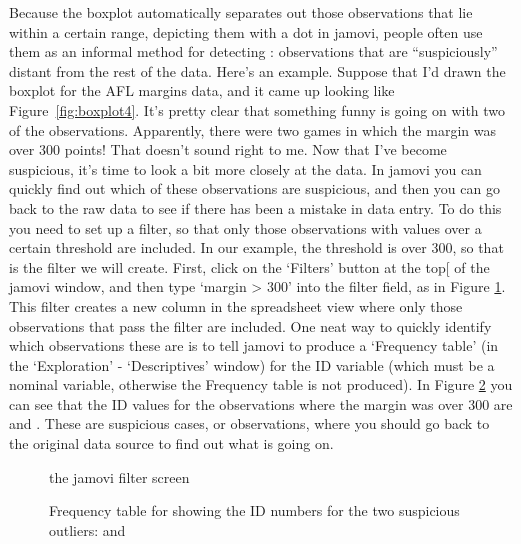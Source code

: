 Because the boxplot automatically separates out those observations that lie within a certain range, depicting them with a dot in jamovi, people often use them as an informal method for detecting : observations that are ``suspiciously'' distant from the rest of the data. Here's an example. Suppose that I'd drawn the boxplot for the AFL margins data, and it came up looking like Figure~\ref{fig:boxplot4}. It's pretty clear that something funny is going on with two of the observations. Apparently, there were two games in which the margin was over 300 points! That doesn't sound right to me. Now that I've become suspicious, it's time to look a bit more closely at the data. In jamovi you can quickly find out which of these observations are suspicious, and then you can go back to the raw data to see if there has been a mistake in data entry. To do this you need to set up a filter, so that only those observations with values over a certain threshold are included. In our example, the threshold is over 300, so that is the filter we will create. First, click on the `Filters' button at the top[ of the jamovi window, and then type `margin > 300' into the filter field, as in Figure \ref{fig:filter1}. This filter creates a new column in the spreadsheet view where only those observations that pass the filter are included. One neat way to quickly identify which observations these are is to tell jamovi to produce a `Frequency table' (in the `Exploration' - `Descriptives' window) for the ID variable (which must be a nominal variable, otherwise the Frequency table is not produced). In Figure \ref{fig:filter2} you can see that the ID values for the observations where the margin was over 300 are  and . These are suspicious cases, or observations, where you should go back to the original data source to find out what is going on.


\begin{figure}[ht]
\begin{center}
\caption{the jamovi filter screen}
\label{fig:filter1}
\HR
\end{center}
\end{figure}

\begin{figure}[ht]
\begin{center}
\caption{Frequency table for  showing the ID numbers for the two suspicious outliers:  and }
\label{fig:filter2}
\HR
\end{center}
\end{figure}


